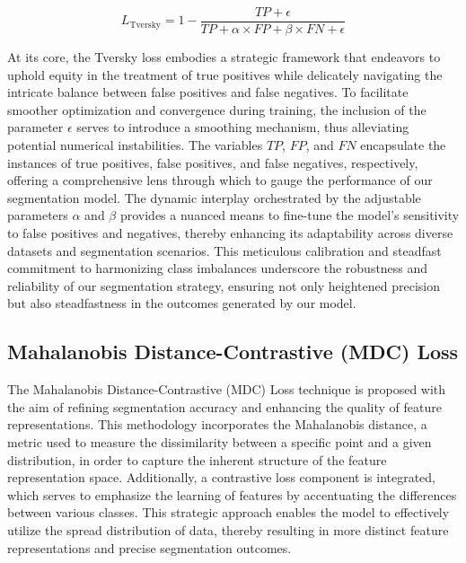 \begin{equation}
\label{EQ: LTversky}
L_{\text{Tversky}} = 1 - \frac{{TP + \epsilon}}{{TP + \alpha \times FP + \beta \times FN + \epsilon}}
\end{equation}

At its core, the Tversky loss embodies a strategic framework that endeavors to uphold equity in the treatment of true positives while delicately navigating the intricate balance between false positives and false negatives. To facilitate smoother optimization and convergence during training, the inclusion of the parameter \(\epsilon\) serves to introduce a smoothing mechanism, thus alleviating potential numerical instabilities. The variables \(TP\), \(FP\), and \(FN\) encapsulate the instances of true positives, false positives, and false negatives, respectively, offering a comprehensive lens through which to gauge the performance of our segmentation model.
The dynamic interplay orchestrated by the adjustable parameters \(\alpha\) and \(\beta\) provides a nuanced means to fine-tune the model's sensitivity to false positives and negatives, thereby enhancing its adaptability across diverse datasets and segmentation scenarios. This meticulous calibration and steadfast commitment to harmonizing class imbalances underscore the robustness and reliability of our segmentation strategy, ensuring not only heightened precision but also steadfastness in the outcomes generated by our model.

\subsection{Mahalanobis Distance-Contrastive (MDC) Loss}

The Mahalanobis Distance-Contrastive (MDC) Loss technique is proposed with the aim of refining segmentation accuracy and enhancing the quality of feature representations. This methodology incorporates the Mahalanobis distance, a metric used to measure the dissimilarity between a specific point and a given distribution, in order to capture the inherent structure of the feature representation space. Additionally, a contrastive loss component is integrated, which serves to emphasize the learning of features by accentuating the differences between various classes. This strategic approach enables the model to effectively utilize the spread distribution of data, thereby resulting in more distinct feature representations and precise segmentation outcomes.


